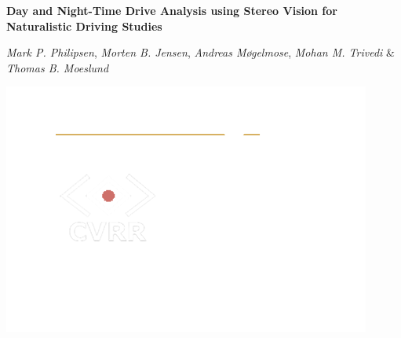 \documentclass[paperwidth=36in,paperheight=27in,landscape,11pt]{preambles/baposter}
\begin{document}
\begin{poster}
{ 
}
{\color{white}\bf
 \LARGE{
  Day and Night-Time Drive Analysis using Stereo Vision for Naturalistic Driving Studies %
 }
}
{\color{white}\scriptsize
  \vspace{0.7em} \begin{large} \textit{Mark P. Philipsen}, \textit{Morten B. Jensen}, \textit{Andreas Møgelmose}, \textit{Mohan M. Trivedi} \& \textit{Thomas B. Moeslund} \end{large} %
}
{
  \includegraphics[height=0.75\headerheight]{preambles/all.png}
%
%
%
%  



}
\end{poster}
\end{document}
